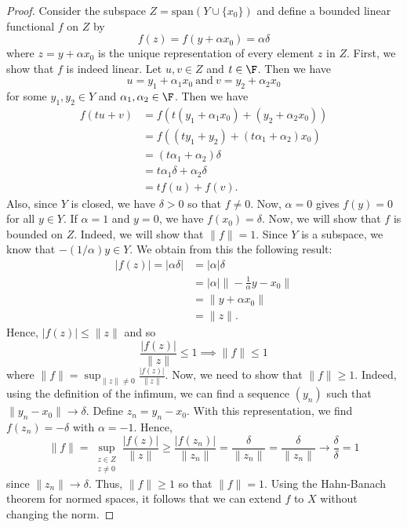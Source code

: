  \begin{proof}
    Consider the subspace \( Z = \text{span}(Y \cup \{ {x}_{0} \} ) \) and define a bounded linear functional \( f  \) on \( Z  \) by 
    \[  f(z) = f(y + \alpha {x}_{0}) = \alpha \delta \]
    where \( z = y + \alpha {x}_{0} \) is the unique representation of every element \( z  \) in \( Z  \). First, we show that \( f  \) is indeed linear. Let \( u,v \in Z \) and \( t \in \F \). Then we have  
    \[  u = {y}_{1} + {\alpha}_{1} {x}_{0} \ \text{and} \ v = {y}_{2} + {\alpha}_{2} {x}_{0} \]
    for some \( {y}_{1}, {y}_{2} \in Y  \) and \( {\alpha}_{1} , {\alpha}_{2} \in \F  \).
    Then we have 
    \begin{align*}
        f(tu + v) &= f(t ({y}_{1} + {\alpha}_{1}{x}_{0}) + ({y}_{2} + {\alpha}_{2} {x}_{0}))   \\
                  &= f((t {y}_{1} + {y}_{2}) + (t {\alpha}_{1} + {\alpha}_{2}) {x}_{0}) \\
                  &= (t {\alpha}_{1} + {\alpha}_{2}) \delta \\
                  &= t {\alpha}_{1} \delta + {\alpha}_{2} \delta \\
                  &= t f(u) + f(v).
    \end{align*}
    Also, since \( Y  \) is closed, we have \( \delta > 0  \) so that \( f \neq 0  \). Now, \( \alpha = 0  \) gives \( f(y) = 0  \) for all \( y \in Y \). If \( \alpha = 1  \) and \( y = 0  \), we have \( f({x}_{0}) = \delta \). Now, we will show that \( f  \) is bounded on \( Z  \). Indeed, we will show that \( \|f\| = 1  \). Since \( Y  \) is a subspace, we know that \( -(1/\alpha)y \in Y \). We obtain from this the following result: 
    \begin{align*}
        | f(z) |  = | \alpha \delta |  &= | \alpha |  \delta \\
                                       &= | \alpha | \Big\| - \frac{ 1 }{ \alpha }  y - {x}_{0} \Big\| \\
                                       &= \|y + \alpha {x}_{0}\| \\
                                       &= \|z\|.
    \end{align*}
    Hence, \( | f(z) |  \leq \|z\| \) and so 
    \[  \frac{ | f(z) |  }{ \|z\| }  \leq  1 \implies \|f\| \leq 1 \]
    where \( \|f\| = \sup_{\|z\|\neq0} \frac{ |f(z)| }{ \|z\| } \). Now, we need to show that \( \|f\| \geq 1  \). Indeed, using the definition of the infimum, we can find a sequence \( ({y}_{n}) \) such that \( \|{y}_{n} - {x}_{0}\| \to \delta \). Define \( {z}_{n} = {y}_{n} - {x}_{0} \). With this representation, we find \( f({z}_{n}) = - \delta \) with \( \alpha = -1  \). Hence, 
    \[  \|f\| = \sup_{\substack{z \in Z \\ z \neq 0}} \frac{ | f(z) |  }{ \|z\| }  \geq \frac{ | f({z}_{n}) |  }{ \|{z}_{n}\| }  = \frac{ \delta }{ \|{z}_{n}\| } = \frac{ \delta }{  \|{z}_{n}\| }  \longrightarrow \frac{ \delta   }{  \delta }  = 1  \]
    since \( \|{z}_{n}\| \to \delta \). Thus, \( \|f\| \geq 1  \) so that \( \|f\| = 1  \). Using the Hahn-Banach theorem for normed spaces, it follows that we can extend \( f  \) to \( X  \) without changing the norm.
 \end{proof}

